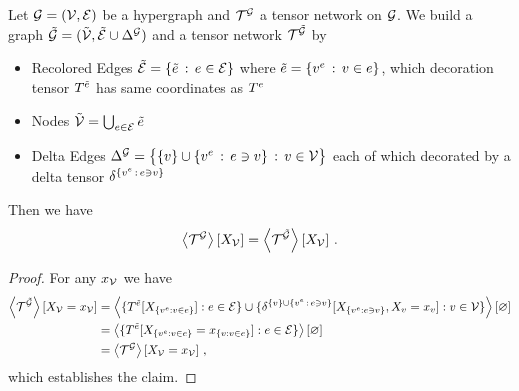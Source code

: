 

\begin{lemma}\label{lem:deltification}
	Let $\mathcal{G}=(\mathcal{V},\mathcal{E})$ be a hypergraph and $\mathcal{T}^{\mathcal{G}}$ a tensor network on $\mathcal{G}$.
	We build a graph $\tilde{\mathcal{G}}=(\tilde{\mathcal{V}},\tilde{\mathcal{E}}\cup\Delta^{\mathcal{G}})$ and a tensor network $\mathcal{T}^{\tilde{\mathcal{G}}}$ by %
	\begin{itemize}
		\item Recolored Edges $\tilde{\mathcal{E}} = \{\tilde{e} \, : \, e\in \mathcal{E}\}$ where $\tilde{e} = \{v^{e} \, : \, v\in e\}$, which decoration tensor $T^{\tilde{e}}$ has same coordinates as $T^{e}$
		\item Nodes $\tilde{\mathcal{V}} = \bigcup_{e\in\mathcal{E}}\tilde{e}$ %
		\item Delta Edges $\Delta^{\mathcal{G}} =  \big\{ \{v\} \cup \{v^{e} \, : \, e\ni v \} \, : \, v\in\mathcal{V} \big\} $ each of which decorated by a delta tensor $\delta^{\{v^{e} \, : \, e\ni v \}}$
	\end{itemize}
	 Then we have
	 	\[ \left\langle \mathcal{T}^{\mathcal{G}}\right\rangle \left[ X_{\mathcal{V}} \right] =  \left\langle \mathcal{T}^{\tilde{\mathcal{G}}}\right\rangle \left[ X_{\mathcal{V}} \right]  \, . \]
\end{lemma}
\begin{proof}
	For any $x_{\mathcal{V}}$ we have 
	\begin{align*}
		 \left\langle \mathcal{T}^{\tilde{\mathcal{G}}}\right\rangle \left[ X_{\mathcal{V}}=x_{\mathcal{V}} \right] 
		 & = \left\langle \{T^{\tilde{e}}[X_{\{v^{e} : v\in e\}}] : e \in \mathcal{E} \}\cup 
		 	\{\delta^{\{v\} \cup \{v^{e} \, : \, e\ni v \}}[X_{\{v^{e} : e\ni v \}}, X_{v}=x_{v} ]  : v\in\mathcal{V} \}
		 \right\rangle \left[ \varnothing \right] \\
		 & =  \left\langle \{T^{\tilde{e}}[X_{\{v^{e} : v\in e\}} = x_{\{v : v\in e\}} ] : e \in \mathcal{E} \}
		 \right\rangle \left[ \varnothing \right] \\
		 & = \left\langle \mathcal{T}^{\mathcal{G}}\right\rangle \left[ X_{\mathcal{V}}=x_{\mathcal{V}} \right] \, ,
	\end{align*}
	which establishes the claim.
\end{proof}



